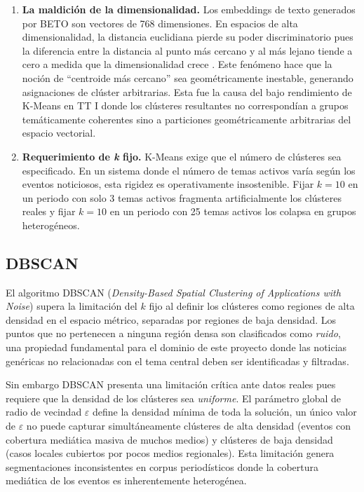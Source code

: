 \begin{enumerate}
    \item \textbf{La maldición de la dimensionalidad.}
          Los embeddings de texto generados por BETO son vectores de 768 dimensiones.
          En espacios de alta dimensionalidad, la distancia euclidiana pierde su
          poder discriminatorio pues la diferencia entre la distancia al punto más
          cercano y al más lejano tiende a cero a medida que la dimensionalidad
          crece \cite{beyer1999nearest}. Este fenómeno hace que la noción de ``centroide
          más cercano'' sea geométricamente inestable, generando asignaciones de clúster
          arbitrarias. Esta fue la causa del bajo rendimiento de K-Means en TT I donde
          los clústeres resultantes no correspondían a grupos temáticamente coherentes sino
          a particiones geométricamente arbitrarias del espacio vectorial.

    \item \textbf{Requerimiento de \textit{k} fijo.} K-Means exige que el número
          de clústeres sea especificado. En un sistema donde el número de temas
          activos varía según los eventos noticiosos, esta rigidez es operativamente
          insostenible. Fijar $k=10$ en un periodo con solo 3 temas activos
          fragmenta artificialmente los clústeres reales y fijar $k=10$ en un
          periodo con 25 temas activos los colapsa en grupos heterogéneos.
\end{enumerate}

\subsection{DBSCAN}
\label{subsec:ea_dbscan}

El algoritmo DBSCAN \cite{ester1996dbscan} (\textit{Density-Based Spatial Clustering
of Applications with Noise}) supera la limitación del $k$ fijo al definir los
clústeres como regiones de alta densidad en el espacio métrico, separadas por
regiones de baja densidad. Los puntos que no pertenecen a ninguna región densa
son clasificados como \textit{ruido}, una propiedad fundamental para el dominio
de este proyecto donde las noticias genéricas no relacionadas con el tema central
deben ser identificadas y filtradas.

Sin embargo DBSCAN presenta una limitación crítica ante datos reales pues requiere
que la densidad de los clústeres sea \textit{uniforme}. El parámetro global de
radio de vecindad $\varepsilon$ define la densidad mínima de toda la solución, un
único valor de $\varepsilon$ no puede capturar simultáneamente clústeres de alta
densidad (eventos con cobertura mediática masiva de muchos medios) y clústeres de
baja densidad (casos locales cubiertos por pocos medios regionales). Esta limitación
genera segmentaciones inconsistentes en corpus periodísticos donde la cobertura
mediática de los eventos es inherentemente heterogénea.

